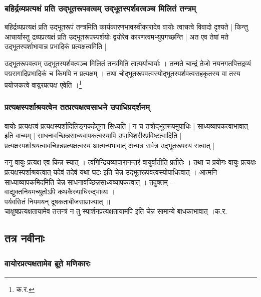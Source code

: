 \subsubsection{बहिर्द्रव्यप्रत्यक्षं प्रति उद्भूतरूपवत्वम् उद्भूतस्पर्शवत्वञ्च मिलितं तन्त्रम्}

बहिर्द्रव्यप्रत्यक्षं प्रति उद्भूतरूपं तन्त्रमिति कार्यकारणभावस्वीकारादेव वायोः त्वाचत्वे विवादो दृश्यते | किन्तु आचार्यास्तु द्रव्यप्रत्यक्षं प्रति उद्भूतरूपस्पर्शयोः द्वयोरेव कारणत्वमभ्युपगच्छन्ति | अत एव तेषां मते उद्भूतस्पर्शाभावान्न प्रभादिकं प्रत्यक्षत्वमिति |

{\fontsize{11.7}{0}\selectfont\s उद्भूतरूपवत्वम् उद्भूतस्पर्शवत्वञ्च मिलितं तन्त्रमिति तात्पर्याचार्याः । तन्मते चान्द्रं तेजो नयनगतपित्तद्रव्यं पद्मरागादिप्रभादिकं च किमपि न प्रत्यक्षम् । तथा चोद्भूतरूपवत्वस्योद्भूतस्पर्शवत्वसहकृतस्य वा तस्य प्रयोजकत्वे वायुरप्रत्यक्ष एवेति ।\footnote{क.र.}}


\subsubsection{प्रत्यक्षस्पर्शाश्रयत्वेन तत्प्रत्यक्षत्वसाधने उपाधिप्रदर्शनम्}

वायोः प्रत्यक्षत्वं प्रत्यक्षस्पर्शादिलिङ्गकहेतुना सिध्यति | न च तत्रोद्भूतरूपमुपाधिः |  साध्यव्यापकत्वाभावात् इति वाच्यम् | साधनावच्छिन्नसाध्यवापकत्वस्यापि उपाधिशरीरप्रविष्टत्वादिति | प्रत्यक्षस्पर्शाश्रयत्वावच्छिन्नप्रत्यक्षत्वस्य आत्मन्यभावात् अन्यत्र सर्वत्र उद्भूतरूपस्य सत्वात् |

{\fontsize{11.7}{0}\selectfont\s ननु वायुः प्रत्यक्ष एव किन्न स्यात् । त्वगिन्द्रियव्यापारानन्तरं वायुर्वातीति प्रतीतेः । तथा च प्रयोगः वायुः प्रत्यक्षः प्रत्यक्षस्पर्शाश्रयत्वात् यदेवं तदेवं यथा घटः इति चेन्न उद्भूतरूपवत्वस्योपाधित्वात् । आत्मनि साध्याव्यापकमिदमिति चेन्न साधनावच्छिन्नसाध्यव्यापकत्वात् । तदुक्तम् –\\
वाद्युक्तनियमच्युतोऽपि कथकैरुपाधिरुद्भाव्यः ।\\[-1mm]
पर्यवसितं नियमयन् दूषकताबीजसाम्राज्यात् ॥\\
चाक्षुषप्रत्यक्षतायामेव तत्तन्त्रं न तु स्पार्शनप्रत्यक्षतायामपि इति चेन्न सामान्ये बाधकाभावात् ।{क.र.}}


\subsection{तत्र नवीनाः}

\subsubsection{वायोरप्रत्यक्षतामेव ब्रूते मणिकारः}

